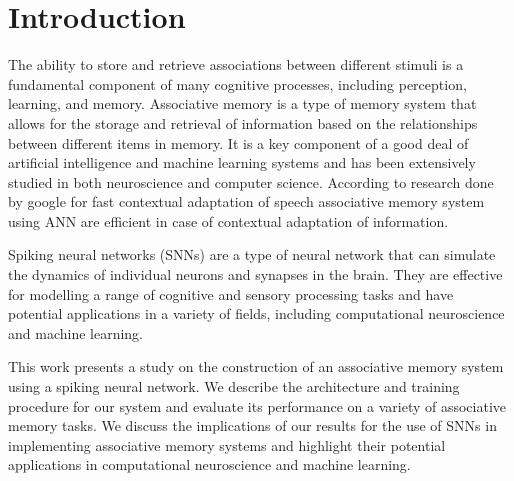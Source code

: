 \chapter{Introduction}%

The ability to store and retrieve associations between different stimuli is a
fundamental component of many cognitive processes, including perception,
learning, and memory. Associative memory is a type of memory system that allows
for the storage and retrieval of information based on the relationships between
different items in memory. It is a key component of a good deal of artificial
intelligence and machine learning systems and has been extensively studied in
both neuroscience and computer science. According to research done by google
for fast contextual adaptation of speech\cite{google} associative memory system
using ANN are efficient in case of contextual adaptation of information.

Spiking neural networks (SNNs) are a type of neural network that can simulate
the dynamics of individual neurons and synapses in the brain. They are
effective for modelling a range of cognitive and sensory processing tasks and
have potential applications in a variety of fields, including computational
neuroscience and machine learning.

This work presents a study on the construction of an associative memory system
using a spiking neural network. We describe the architecture and training
procedure for our system and evaluate its performance on a variety of
associative memory tasks. We discuss the implications of our results for the
use of SNNs in implementing associative memory systems and highlight their
potential applications in computational neuroscience and machine learning.

\thispagestyle{plain}